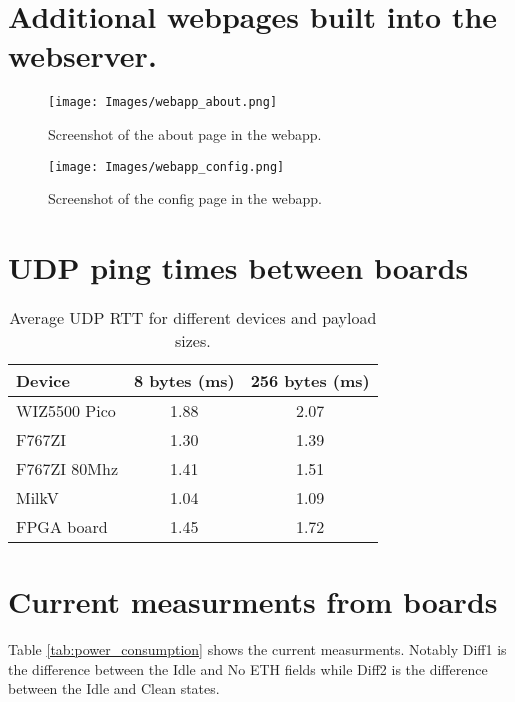\section{Additional webpages built into the webserver.}
\label{app:additional_webpages}
\begin{figure}[h!]
    \centering
    \texttt{[image: Images/webapp\_about.png]}
    \caption{Screenshot of the about page in the webapp.}
    \label{fig:web_app_about}
\end{figure}

\begin{figure}[h!]
    \centering
    \texttt{[image: Images/webapp\_config.png]}
    \caption{Screenshot of the config page in the webapp.}
    \label{fig:web_app_config}
\end{figure}


\section{UDP ping times between boards}
\label{app:udp_ping_measurements}
\begin{table}[ht]
    \centering
    \caption{Average UDP RTT for different devices and payload sizes.}
    \begin{tabular}{lcc}
    \toprule
    Device & 8 bytes (ms) & 256 bytes (ms) \\
    \midrule
    WIZ5500 Pico & 1.88 & 2.07 \\
    F767ZI & 1.30 & 1.39 \\
    F767ZI 80Mhz & 1.41 & 1.51 \\
    MilkV & 1.04 & 1.09 \\
    FPGA board & 1.45 & 1.72 \\
    \bottomrule
    \end{tabular}
    \end{table}

\section{Current measurments from boards}
\label{app:current_measurements}

Table \ref{tab:power_consumption} shows the current measurments. Notably Diff1 is the difference between the Idle and No ETH fields while Diff2 is the difference between the Idle and Clean states.

